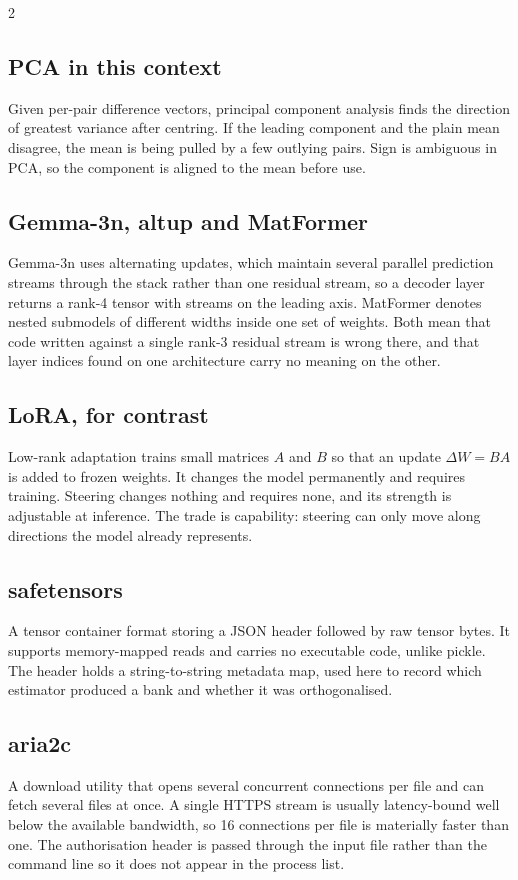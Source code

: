 \documentclass[twocolumn,10pt,a4paper]{article}
\begin{document}
\begin{multicols}{2}
\subsection*{PCA in this context}
Given per-pair difference vectors, principal component analysis finds the
direction of greatest variance after centring. If the leading component and the
plain mean disagree, the mean is being pulled by a few outlying pairs. Sign is
ambiguous in PCA, so the component is aligned to the mean before use.

\subsection*{Gemma-3n, altup and MatFormer}
Gemma-3n uses alternating updates, which maintain several parallel prediction
streams through the stack rather than one residual stream, so a decoder layer
returns a rank-4 tensor with streams on the leading axis. MatFormer denotes
nested submodels of different widths inside one set of weights. Both mean that
code written against a single rank-3 residual stream is wrong there, and that
layer indices found on one architecture carry no meaning on the other.

\subsection*{LoRA, for contrast}
Low-rank adaptation trains small matrices $A$ and $B$ so that an update
$\Delta W = BA$ is added to frozen weights. It changes the model permanently and
requires training. Steering changes nothing and requires none, and its strength
is adjustable at inference. The trade is capability: steering can only move along
directions the model already represents.

\subsection*{safetensors}
A tensor container format storing a JSON header followed by raw tensor bytes.
It supports memory-mapped reads and carries no executable code, unlike pickle.
The header holds a string-to-string metadata map, used here to record which
estimator produced a bank and whether it was orthogonalised.

\subsection*{aria2c}
A download utility that opens several concurrent connections per file and can
fetch several files at once. A single HTTPS stream is usually latency-bound well
below the available bandwidth, so 16 connections per file is materially faster
than one. The authorisation header is passed through the input file rather than
the command line so it does not appear in the process list.


\end{multicols}
\end{document}
